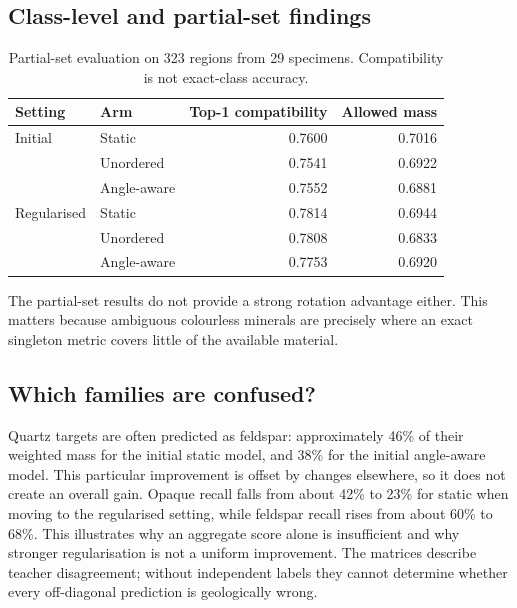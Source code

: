 \subsection{Class-level and partial-set findings}
\begin{table}[htbp]\centering
\begin{tabular}{@{}llrr@{}}\toprule Setting & Arm & Top-1 compatibility & Allowed mass\\\midrule
Initial & Static & 0.7600 & 0.7016\\
 & Unordered & 0.7541 & 0.6922\\
 & Angle-aware & 0.7552 & 0.6881\\\midrule
Regularised & Static & 0.7814 & 0.6944\\
 & Unordered & 0.7808 & 0.6833\\
 & Angle-aware & 0.7753 & 0.6920\\\bottomrule
\end{tabular}
\caption{Partial-set evaluation on 323 regions from 29 specimens. Compatibility is not exact-class accuracy.}
\end{table}
The partial-set results do not provide a strong rotation advantage either. This matters because ambiguous colourless minerals are precisely where an exact singleton metric covers little of the available material.

\FloatBarrier
\subsection{Which families are confused?}
Quartz targets are often predicted as feldspar: approximately 46\% of their weighted mass for the initial static model, and 38\% for the initial angle-aware model. This particular improvement is offset by changes elsewhere, so it does not create an overall gain. Opaque recall falls from about 42\% to 23\% for static when moving to the regularised setting, while feldspar recall rises from about 60\% to 68\%. This illustrates why an aggregate score alone is insufficient and why stronger regularisation is not a uniform improvement. The matrices describe teacher disagreement; without independent labels they cannot determine whether every off-diagonal prediction is geologically wrong.

